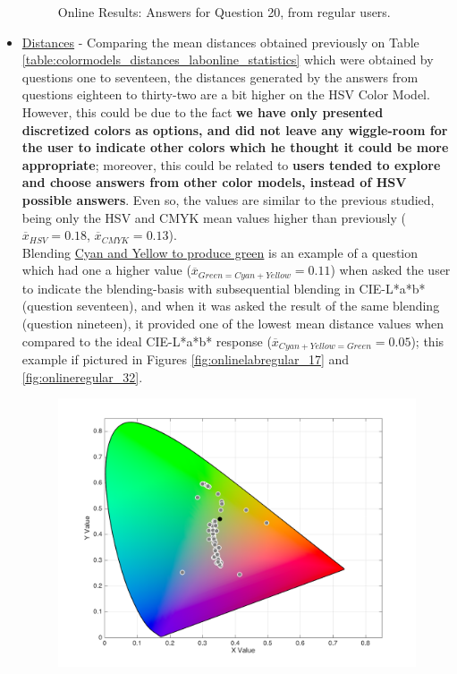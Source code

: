 \begin{itemize}
\begin{figure}[!htbp]
    \caption[Online Results: Answers for Question 20, from regular users.]{Online Results: Answers for Question 20, from regular users.}
    \label{fig:onlineregular_20}
  \end{figure}
  \item \ul{Distances} - Comparing the mean distances obtained previously on Table \ref{table:colormodels_distances_labonline_statistics} which were obtained by questions one to seventeen, the distances generated
  by the answers from questions eighteen to thirty-two are a bit higher on the HSV Color Model. However, this could be due to the fact \textbf{we have only presented discretized colors as options, and did not
  leave any wiggle-room for the user to indicate other colors which he thought it could be more appropriate}; moreover, this could be related to \textbf{users tended to explore and choose answers from other color
  models, instead of HSV possible answers}. Even so, the values are similar to the previous studied, being only the HSV and CMYK mean values higher than previously ($\overline{x}_{HSV} = 0.18$, $\overline{x}_{CMYK} = 0.13$).\\
  Blending \ul{Cyan and Yellow to produce green} is an example of a question which had one a higher value ($\overline{x}_{Green = Cyan + Yellow} = 0.11$) when asked the user to indicate the blending-basis with subsequential
  blending in CIE-L*a*b* (question seventeen), and when it was asked the result of the same blending (question nineteen), it provided one of the lowest mean distance values when compared to the ideal CIE-L*a*b* response
  ($\overline{x}_{Cyan + Yellow = Green} = 0.05$); this example if pictured in Figures
  \ref{fig:onlinelabregular_17} and \ref{fig:onlineregular_32}.
  \begin{figure}[!htbp]
    \centering
    \begin{minipage}{0.48\textwidth}
      \centering
      \includegraphics[width=\textwidth]{images/results/17_online_Labresponses.png}

\end{minipage}
\end{figure}
\end{itemize}
